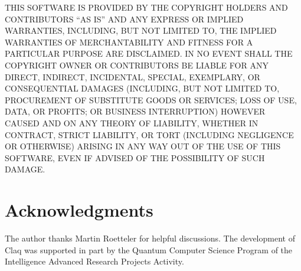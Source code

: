 \documentclass[letterpaper,11pt]{article}
\begin{document}
THIS SOFTWARE IS PROVIDED BY THE COPYRIGHT HOLDERS AND CONTRIBUTORS
``AS IS'' AND ANY EXPRESS OR IMPLIED WARRANTIES\@, INCLUDING\@, BUT NOT
LIMITED TO\@, THE IMPLIED WARRANTIES OF MERCHANTABILITY AND FITNESS FOR
A PARTICULAR PURPOSE ARE DISCLAIMED\@.  IN NO EVENT SHALL THE COPYRIGHT
OWNER OR CONTRIBUTORS BE LIABLE FOR ANY DIRECT\@, INDIRECT\@, INCIDENTAL\@,
SPECIAL\@, EXEMPLARY\@, OR CONSEQUENTIAL DAMAGES (INCLUDING\@, BUT NOT
LIMITED TO\@, PROCUREMENT OF SUBSTITUTE GOODS OR SERVICES\@; LOSS OF USE\@,
DATA\@, OR PROFITS\@; OR BUSINESS INTERRUPTION) HOWEVER CAUSED AND ON ANY
THEORY OF LIABILITY\@, WHETHER IN CONTRACT\@, STRICT LIABILITY\@, OR TORT
(INCLUDING NEGLIGENCE OR OTHERWISE) ARISING IN ANY WAY OUT OF THE USE
OF THIS SOFTWARE\@, EVEN IF ADVISED OF THE POSSIBILITY OF SUCH DAMAGE.

\section*{Acknowledgments}

The author thanks Martin Roetteler for helpful discussions.
The development of Claq was supported in part by the Quantum Computer Science Program
of the Intelligence Advanced Research Projects Activity.
\end{document}
